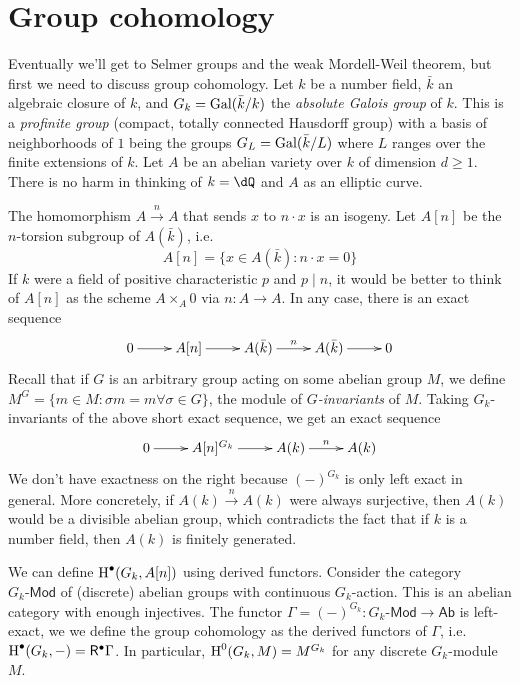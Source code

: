 \documentclass{article}
\begin{document}
\section{Group cohomology}

Eventually we'll get to Selmer groups and the weak Mordell-Weil theorem, but 
first we need to discuss group cohomology. Let $k$ be a number field, $\bar k$ 
an algebraic closure of $k$, and $G_k=\operatorname{Gal}(\bar k/k)$ the \emph{absolute Galois 
group} of $k$. This is a \emph{profinite group} (compact, totally connected 
Hausdorff group) with a basis of neighborhoods of $1$ being the groups 
$G_L=\operatorname{Gal}(\bar k/L)$ where $L$ ranges over the finite extensions of $k$. Let 
$A$ be an abelian variety over $k$ of dimension $d\geqslant 1$. There is no 
harm in thinking of $k=\dQ$ and $A$ as an elliptic curve. 

The homomorphism $A\xrightarrow n A$ that sends $x$ to $n\cdot x$ is an 
isogeny. Let $A[n]$ be the $n$-torsion subgroup of $A(\bar k)$, i.e. 
\[
  A[n] = \{x\in A(\bar k) : n\cdot x = 0\}
\]
If $k$ were a field of positive characteristic $p$ and $p\mid n$, it would be 
better to think of $A[n]$ as the scheme $A\times_A 0$ via $n:A\to A$. In any 
case, there is an exact sequence 
\[\xymatrix{
  0 \ar[r] 
    & A[n] \ar[r] 
    & A(\bar k) \ar[r]^-n 
    & A(\bar k) \ar[r] 
    & 0
}\]
Recall that if $G$ is an arbitrary group acting on some abelian group $M$, we 
define $M^G=\{m\in M:\sigma m = m\forall \sigma\in G\}$, the module of 
\emph{$G$-invariants} of $M$. Taking $G_k$-invariants of the above short exact 
sequence, we get an exact sequence 
\[\xymatrix{
  0 \ar[r] 
    & A[n]^{G_k} \ar[r] 
    & A(k) \ar[r]^-n 
    & A(k)
}\]
We don't have exactness on the right because $(-)^{G_k}$ is only left exact in 
general. More concretely, if $A(k)\xrightarrow n A(k)$ were always surjective, 
then $A(k)$ would be a divisible abelian group, which contradicts the fact that 
if $k$ is a number field, then $A(k)$ is finitely generated. 

We can define $\operatorname{H}^\bullet(G_k,A[n])$ using derived functors. Consider the 
category $G_k\text{-}\mathsf{Mod}$ of (discrete) abelian groups with continuous 
$G_k$-action. This is an abelian category with enough injectives. The functor 
$\Gamma=(-)^{G_k}:G_k\text{-}\mathsf{Mod}\to \mathsf{Ab}$ is left-exact, we we 
define the group cohomology as the derived functors of $\Gamma$, i.e. 
$\operatorname{H}^\bullet(G_k,-) = \mathsf{R}^\bullet \Gamma$. In particular, 
$\operatorname{H}^0(G_k,M) = M^{G_k}$ for any discrete $G_k$-module $M$. 
\end{document}

